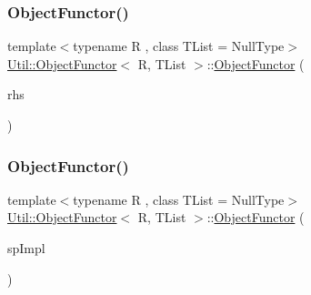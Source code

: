 \subsubsection{\texorpdfstring{ObjectFunctor()}{ObjectFunctor()}\hspace{0.1cm}{\footnotesize\ttfamily [7/10]}}
{\footnotesize\ttfamily template$<$typename R , class T\+List  = Null\+Type$>$ \\
\mbox{\hyperlink{classUtil_1_1ObjectFunctor}{Util\+::\+Object\+Functor}}$<$ R, T\+List $>$\+::\mbox{\hyperlink{classUtil_1_1ObjectFunctor}{Object\+Functor}} (\begin{DoxyParamCaption}\item[{const \mbox{\hyperlink{classUtil_1_1ObjectFunctor}{Object\+Functor}}$<$ R, T\+List $>$ \&}]{rhs }\end{DoxyParamCaption})\hspace{0.3cm}{\ttfamily [inline]}}

\mbox{\label{classUtil_1_1ObjectFunctor_a60702c933bbfec0d0a0e4459debe21b7}} 
\subsubsection{\texorpdfstring{ObjectFunctor()}{ObjectFunctor()}\hspace{0.1cm}{\footnotesize\ttfamily [8/10]}}
{\footnotesize\ttfamily template$<$typename R , class T\+List  = Null\+Type$>$ \\
\mbox{\hyperlink{classUtil_1_1ObjectFunctor}{Util\+::\+Object\+Functor}}$<$ R, T\+List $>$\+::\mbox{\hyperlink{classUtil_1_1ObjectFunctor}{Object\+Functor}} (\begin{DoxyParamCaption}\item[{std\+::auto\+\_\+ptr$<$ \mbox{\hyperlink{classUtil_1_1ObjectFunctor_a93fc635194d1d2768e73ba87d03abd8d}{Impl}} $>$}]{sp\+Impl }\end{DoxyParamCaption})\hspace{0.3cm}{\ttfamily [inline]}}

\mbox{\label{classUtil_1_1ObjectFunctor_a8a0c7fe30526a774ce94c7a24af4108d}} 

